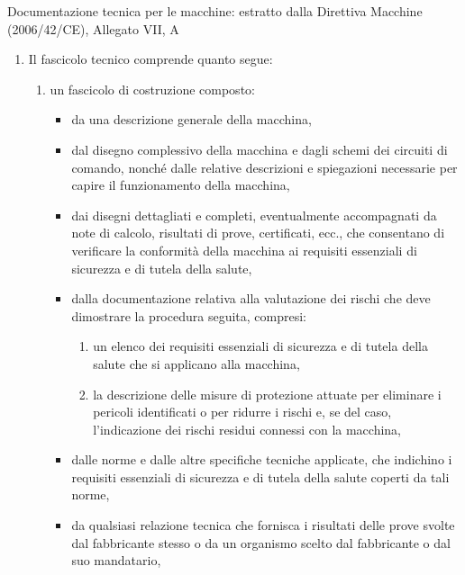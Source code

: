 \begin{riquadro}[label=box:06-2]{Documentazione tecnica per le macchine: estratto dalla Direttiva Macchine (2006/42/CE), Allegato VII, A}
\begin{enumerate}[label=\arabic*., leftmargin=1.5em, itemsep=0pt, parsep=0pt, topsep=0pt]
    \item Il fascicolo tecnico comprende quanto segue:
    \begin{enumerate}[label=\alph*), leftmargin=1.5em, itemsep=0pt, parsep=0pt, topsep=0pt]
        \item un fascicolo di costruzione composto:
        \begin{itemize}[label=---, leftmargin=1.8em, itemsep=0pt, parsep=0pt, topsep=0pt]
            \item da una descrizione generale della macchina,
            \item dal disegno complessivo della macchina e dagli schemi dei circuiti di comando, nonché dalle relative descrizioni e spiegazioni necessarie per capire il funzionamento della macchina,
            \item dai disegni dettagliati e completi, eventualmente accompagnati da note di calcolo, risultati di prove, certificati, ecc., che consentano di verificare la conformità della macchina ai requisiti essenziali di sicurezza e di tutela della salute,
            \item dalla documentazione relativa alla valutazione dei rischi che deve dimostrare la procedura seguita, compresi:
            \begin{enumerate}[label=\roman*), leftmargin=1.8em, itemsep=0pt, parsep=0pt, topsep=0pt]
                \item un elenco dei requisiti essenziali di sicurezza e di tutela della salute che si applicano alla macchina,
                \item la descrizione delle misure di protezione attuate per eliminare i pericoli identificati o per ridurre i rischi e, se del caso, l'indicazione dei rischi residui connessi con la macchina,
            \end{enumerate}
            \item dalle norme e dalle altre specifiche tecniche applicate, che indichino i requisiti essenziali di sicurezza e di tutela della salute coperti da tali norme,
            \item da qualsiasi relazione tecnica che fornisca i risultati delle prove svolte dal fabbricante stesso o da un organismo scelto dal fabbricante o dal suo mandatario,

\end{itemize}
\end{enumerate}
\end{enumerate}
\end{riquadro}

